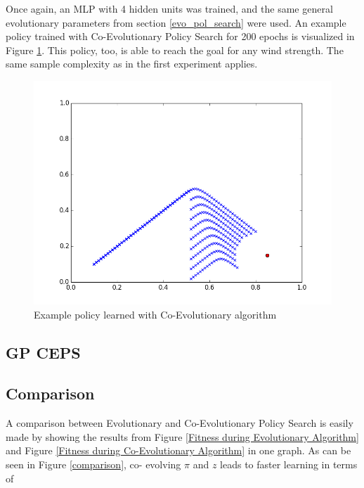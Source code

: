 Once again, an MLP with 4 hidden units was trained, and the same general evolutionary parameters from section \ref{evo_pol_search} were used. An example policy trained with Co-Evolutionary Policy Search for 200 epochs is visualized in Figure \ref{Example policy learned with Co-Evolutionary algorithm}. This policy, too, is able to reach the goal for any wind strength. The same sample complexity as in the first experiment applies.


\begin{figure}[ht]
  \centering
  \includegraphics[scale=0.5]{images/co_evo_result.png}
  \caption{Example policy learned with Co-Evolutionary algorithm}\label{Example policy learned with Co-Evolutionary algorithm}
\end{figure}

\subsection{GP CEPS}

\subsection{Comparison}

A comparison between Evolutionary and Co-Evolutionary Policy Search is easily made by showing the results from Figure \ref{Fitness during Evolutionary Algorithm} and Figure \ref{Fitness during Co-Evolutionary Algorithm} in one graph. As can be seen in Figure \ref{comparison}, co-
evolving $\pi$ and $z$ leads to faster learning in terms of 

